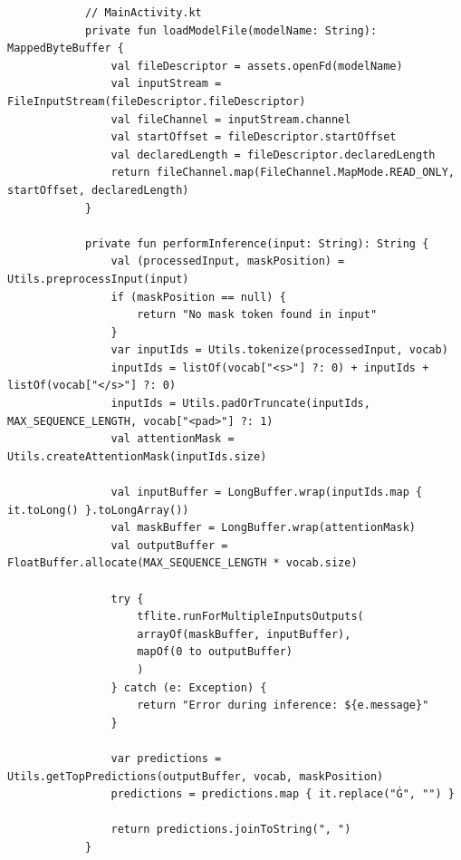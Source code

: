     \begin{listing}
        \begin{verbatim}
            // MainActivity.kt
            private fun loadModelFile(modelName: String): MappedByteBuffer {
                val fileDescriptor = assets.openFd(modelName)
                val inputStream = FileInputStream(fileDescriptor.fileDescriptor)
                val fileChannel = inputStream.channel
                val startOffset = fileDescriptor.startOffset
                val declaredLength = fileDescriptor.declaredLength
                return fileChannel.map(FileChannel.MapMode.READ_ONLY, startOffset, declaredLength)
            }
            
            private fun performInference(input: String): String {
                val (processedInput, maskPosition) = Utils.preprocessInput(input)
                if (maskPosition == null) {
                    return "No mask token found in input"
                }
                var inputIds = Utils.tokenize(processedInput, vocab)
                inputIds = listOf(vocab["<s>"] ?: 0) + inputIds + listOf(vocab["</s>"] ?: 0)
                inputIds = Utils.padOrTruncate(inputIds, MAX_SEQUENCE_LENGTH, vocab["<pad>"] ?: 1)
                val attentionMask = Utils.createAttentionMask(inputIds.size)
                
                val inputBuffer = LongBuffer.wrap(inputIds.map { it.toLong() }.toLongArray())
                val maskBuffer = LongBuffer.wrap(attentionMask)
                val outputBuffer = FloatBuffer.allocate(MAX_SEQUENCE_LENGTH * vocab.size)
                
                try {
                    tflite.runForMultipleInputsOutputs(
                    arrayOf(maskBuffer, inputBuffer),
                    mapOf(0 to outputBuffer)
                    )
                } catch (e: Exception) {
                    return "Error during inference: ${e.message}"
                }
                
                var predictions = Utils.getTopPredictions(outputBuffer, vocab, maskPosition)
                predictions = predictions.map { it.replace("Ġ", "") }
                
                return predictions.joinToString(", ")
            }
        \end{verbatim}
        \caption[\texttt{MainActivity.kt} (deel 2)]{In dit tweede deel van \texttt{MainActivity.kt} worden functies zoals \texttt{performInference} gedefinieerd. Deze functie gebruikt methoden zoals \texttt{preprocessInput} en \texttt{tokenize} uit het utility-object om de invoerdata voor te bereiden.}
        \label{lst:main-activity-part2}
    \end{listing}
    
